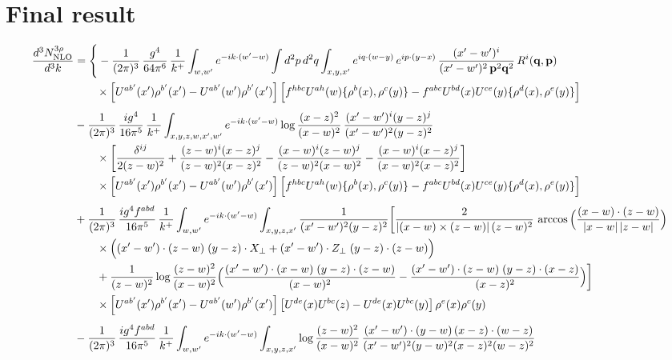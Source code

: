 \documentclass[9pt]{article}
\numberwithin{equation}{section}
\begin{document}
\section{Final result}
\begin{align}
\frac{d^{3}N^{3\rho}_{\rm NLO}}{d^{3}k}&=\Bigg\{-\frac{1}{(2\pi)^{3}}\,\frac{g^{4}}{64\pi^{6}}\,\frac{1}{k^{+}}\int_{w,w'} e^{-ik\cdot(w'-w)}
\int d^{2}p\,d^{2}q\int_{x,y,x'} e^{iq\cdot(w-y)}\,e^{ip\cdot(y-x)}\,\frac{(x'-w')^{i}}{(x'-w')^{2}\,\mathbf{p}^{2}\mathbf{q}^{2}}\,R^{i}(\mathbf{q},\mathbf{p})\notag\\&\qquad\times\left[U^{ab'}(x')\rho^{b'}(x')-U^{ab'}(w')\rho^{b'}(x')\right]\Big[f^{hbc}U^{ah}(w)\{\rho^{b}(x),\rho^{c}(y)\}-f^{abc}U^{bd}(x)U^{ce}(y)\{\rho^{d}(x),\rho^{e}(y)\}\Big]\notag\\[4pt]
&-\frac{1}{(2\pi)^{3}}\,\frac{ig^{4}}{16\pi^{5}}\,\frac{1}{k^{+}}\int_{x,y,z,w,x',w'}e^{-ik\cdot(w'-w)}\log\frac{(x-z)^{2}}{(x-w)^{2}}\,\frac{(x'-w')^{i}(y-z)^{j}}{(x'-w')^{2}(y-z)^{2}}\notag\\&\qquad\times\bigg[\frac{\delta^{ij}}{2(z-w)^{2}}+\frac{(z-w)^{i}(x-z)^{j}}{(z-w)^{2}(x-z)^{2}}-\frac{(x-w)^{i}(z-w)^{j}}{(z-w)^{2}(x-w)^{2}}-\frac{(x-w)^{i}(x-z)^{j}}{(x-w)^{2}(x-z)^{2}}\bigg]\notag\\
&\qquad\times\left[U^{ab'}(x')\rho^{b'}(x')-U^{ab'}(w')\rho^{b'}(x')\right]\Big[f^{hbc}U^{ah}(w)\{\rho^{b}(x),\rho^{c}(y)\}-f^{abc}U^{bd}(x)U^{ce}(y)\{\rho^{d}(x),\rho^{e}(y)\}\Big]\notag\\[4pt]
&+\frac{1}{(2\pi)^{3}}\,\frac{ig^{4}f^{abd}}{16\pi^{5}}\,\frac{1}{k^{+}}\int_{w,w'}e^{-ik\cdot(w'-w)}\int_{x,y,z,x'}\frac{1}{(x'-w')^{2}(y-z)^{2}}\bigg[\frac{2}{|(x-w)\times(z-w)|\,(z-w)^{2}}\,\arccos\Big(\frac{(x-w)\cdot(z-w)}{|x-w|\,|z-w|}\Big)\notag\\
&\qquad\times\Big((x'-w')\cdot(z-w)\;(y-z)\cdot X_{\perp}+(x'-w')\cdot Z_{\perp}\;(y-z)\cdot(z-w)\Big)\notag\\
&\qquad+\frac{1}{(z-w)^{2}}\log\frac{(z-w)^{2}}{(x-w)^{2}}\Big(\frac{(x'-w')\cdot(x-w)\;(y-z)\cdot(z-w)}{(x-w)^{2}}-\frac{(x'-w')\cdot(z-w)\;(y-z)\cdot(x-z)}{(x-z)^{2}}\Big)\bigg]\notag\\
&\qquad\times\left[U^{ab'}(x')\rho^{b'}(x')-U^{ab'}(w')\rho^{b'}(x')\right]\left[U^{de}(x)U^{bc}(z)-U^{de}(x)U^{bc}(y)\right]\rho^{e}(x)\rho^{c}(y)\notag\\[4pt]
&-\frac{1}{(2\pi)^{3}}\,\frac{ig^{4}f^{abd}}{16\pi^{5}}\,\frac{1}{k^{+}}\int_{w,w'}e^{-ik\cdot(w'-w)}\int_{x,y,z,x'}\log\frac{(z-w)^{2}}{(x-w)^{2}}\,\frac{(x'-w')\cdot(y-w)\,(x-z)\cdot(w-z)}{(x'-w')^{2}(y-w)^{2}(x-z)^{2}(w-z)^{2}}\notag\\

\end{align}
\end{document}
